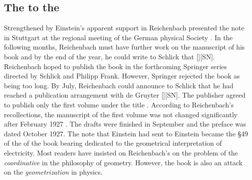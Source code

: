 \documentclass[draft]{article}
\newcommand{\PRZL}{\citetitle{Reichenbach1928}\xspace}
\newcommand{\Reich}{Reichenbach\xspace}
\newcommand{\FP}{\german{Fernparallelismus}\xspace}
\begin{document}
\subsection{The \Ap to the \PRZL}

Strengthened by Einstein's apparent support in  Reichenbach presented the note in Stuttgart at the regional meeting of the German physical Society \citep{Reichenbach1926d}. In the following months, Reichenbach must have further work on the manuscript of his book and by the end of the year, he could write to Schlick that  [][SN]\label{RZL1926}. Reichenbach hoped to publish the book in the forthcoming Springer series  directed by Schlick and Philipp Frank. However, Springer rejected the book as being too long. By July, Reichenbach could announce to Schlick that he had reached a publication arrangement with de Gruyter [][SN]. The publisher agreed to publish only the first volume under the title . According to \Reich's recollections, the manuscript of the first volume was not changed significantly after February 1927 \citep[044-06-25]{HR}. The drafts were finished in September and the preface was dated October 1927. The note that Einstein had sent to Einstein became the \S49 of the \Ap of the book bearing dedicated to the geometrical interpretation of electricity. Most readers have insisted on Reichenbach's on the problem of the \emph{coordinative} in the philosophy of geometry. However, the book is also an attack on the \emph{geometrization} in physics.


 
\end{document}
